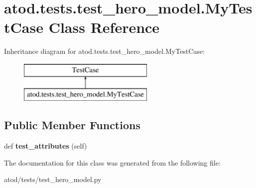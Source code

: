 \hypertarget{classatod_1_1tests_1_1test__hero__model_1_1_my_test_case}{}\section{atod.\+tests.\+test\+\_\+hero\+\_\+model.\+My\+Test\+Case Class Reference}
\label{classatod_1_1tests_1_1test__hero__model_1_1_my_test_case}
Inheritance diagram for atod.\+tests.\+test\+\_\+hero\+\_\+model.\+My\+Test\+Case\+:\begin{figure}[H]
\begin{center}
\leavevmode
\includegraphics[height=2.000000cm]{classatod_1_1tests_1_1test__hero__model_1_1_my_test_case}
\end{center}
\end{figure}
\subsection*{Public Member Functions}
\begin{DoxyCompactItemize}
\item 
def {\bfseries test\+\_\+attributes} (self)\hypertarget{classatod_1_1tests_1_1test__hero__model_1_1_my_test_case_aa1c40260186074876e6b1879be830448}{}\label{classatod_1_1tests_1_1test__hero__model_1_1_my_test_case_aa1c40260186074876e6b1879be830448}

\end{DoxyCompactItemize}


The documentation for this class was generated from the following file\+:\begin{DoxyCompactItemize}
\item 
atod/tests/test\+\_\+hero\+\_\+model.\+py\end{DoxyCompactItemize}
